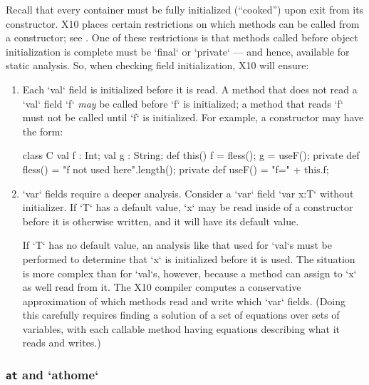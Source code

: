 Recall that every container must be fully initialized (``cooked'') upon exit
from its constructor.  
X10 places certain restrictions on which methods can be called from a
constructor; see .  One of these restrictions is that
methods called before object initialization is complete must be \xcd`final` or
\xcd`private` --- and hence, available for static analysis.  So, when checking
field initialization, X10 will ensure: 
\begin{enumerate}
\item Each \xcd`val` field is initialized before it is read.   
      A method that does not read a \xcd`val` field \xcd`f` {\em may} be
      called before \xcd`f` is initialized; a method that reads \xcd`f` must
      not be called until \xcd`f` is initialized.        
      For example, 
      a constructor may have the form:
\begin{xten}
class C {
  val f : Int;
  val g : String;
  def this() {
     f = fless();
     g = useF();
  }
  private def fless() = "f not used here".length();
  private def useF() = "f=" + this.f;
}
\end{xten}
%

\item \xcd`var` fields require a deeper analysis.  Consider a \xcd`var`
      field \xcd`var x:T`  without initializer.  If \xcd`T` has a default
      value, \xcd`x` may be read inside of a constructor before it is
      otherwise written, and it will 
      have its default value.   

      If \xcd`T` has no default value, an analysis
      like that used for \xcd`val`s must be performed to determine that
      \xcd`x` is initialized before it is used.  The situation is 
      more complex than for \xcd`val`s, however, because a method can assign to
      \xcd`x` as well read from it.  The X10 compiler computes a conservative
      approximation of which methods
      read and write which \xcd`var` fields. (Doing this carefully 
      requires finding a solution of a set of equations over sets of
      variables, with each callable method having equations describing what it
      reads and writes.)    

\end{enumerate}


\subsubsection{{\tt at} and \xcd`athome`}

